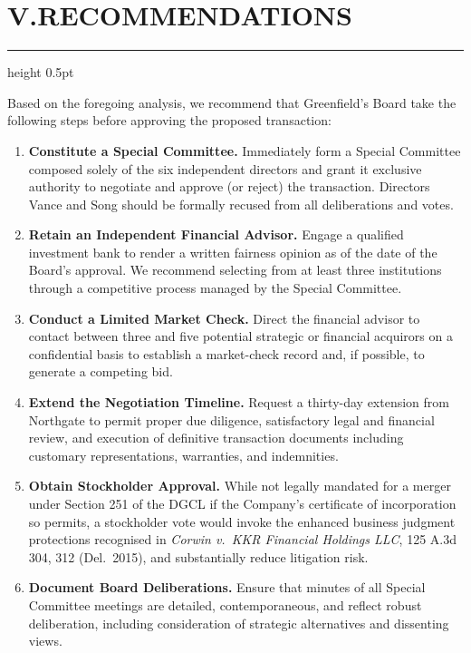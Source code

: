 \section*{V.\quad RECOMMENDATIONS}

{\color{rule}\hrule height 0.5pt}\vspace{6pt}

Based on the foregoing analysis, we recommend that Greenfield's Board take the following steps before approving the proposed transaction:

\begin{enumerate}
  \item \textbf{Constitute a Special Committee.}  Immediately form a Special Committee composed solely of the six independent directors and grant it exclusive authority to negotiate and approve (or reject) the transaction.  Directors Vance and Song should be formally recused from all deliberations and votes.

  \item \textbf{Retain an Independent Financial Advisor.}  Engage a qualified investment bank to render a written fairness opinion as of the date of the Board's approval.  We recommend selecting from at least three institutions through a competitive process managed by the Special Committee.

  \item \textbf{Conduct a Limited Market Check.}  Direct the financial advisor to contact between three and five potential strategic or financial acquirors on a confidential basis to establish a market-check record and, if possible, to generate a competing bid.

  \item \textbf{Extend the Negotiation Timeline.}  Request a thirty-day extension from Northgate to permit proper due diligence, satisfactory legal and financial review, and execution of definitive transaction documents including customary representations, warranties, and indemnities.

  \item \textbf{Obtain Stockholder Approval.}  While not legally mandated for a merger under Section 251 of the DGCL if the Company's certificate of incorporation so permits, a stockholder vote would invoke the enhanced business judgment protections recognised in \textit{Corwin v.\ KKR Financial Holdings LLC}, 125 A.3d 304, 312 (Del.\ 2015), and substantially reduce litigation risk.

  \item \textbf{Document Board Deliberations.}  Ensure that minutes of all Special Committee meetings are detailed, contemporaneous, and reflect robust deliberation, including consideration of strategic alternatives and dissenting views.
\end{enumerate}

\vspace{6pt}

